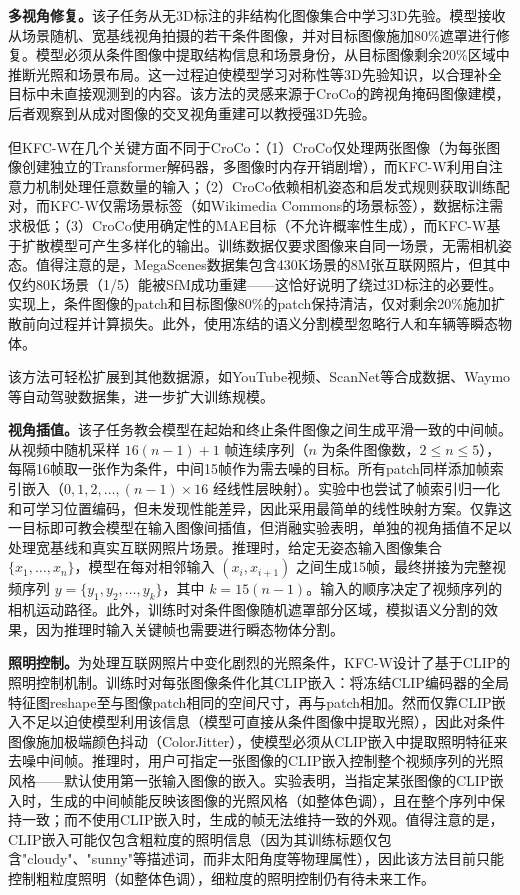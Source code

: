\textbf{多视角修复。}该子任务从无3D标注的非结构化图像集合中学习3D先验。模型接收从场景随机、宽基线视角拍摄的若干条件图像，并对目标图像施加80\%遮罩进行修复。模型必须从条件图像中提取结构信息和场景身份，从目标图像剩余20\%区域中推断光照和场景布局。这一过程迫使模型学习对称性等3D先验知识，以合理补全目标中未直接观测到的内容。该方法的灵感来源于CroCo的跨视角掩码图像建模，后者观察到从成对图像的交叉视角重建可以教授强3D先验。

但KFC-W在几个关键方面不同于CroCo：（1）CroCo仅处理两张图像（为每张图像创建独立的Transformer解码器，多图像时内存开销剧增），而KFC-W利用自注意力机制处理任意数量的输入；（2）CroCo依赖相机姿态和启发式规则获取训练配对，而KFC-W仅需场景标签（如Wikimedia Commons的场景标签），数据标注需求极低；（3）CroCo使用确定性的MAE目标（不允许概率性生成），而KFC-W基于扩散模型可产生多样化的输出。训练数据仅要求图像来自同一场景，无需相机姿态。值得注意的是，MegaScenes数据集包含430K场景的8M张互联网照片，但其中仅约80K场景（1/5）能被SfM成功重建——这恰好说明了绕过3D标注的必要性。实现上，条件图像的patch和目标图像80\%的patch保持清洁，仅对剩余20\%施加扩散前向过程并计算损失。此外，使用冻结的语义分割模型忽略行人和车辆等瞬态物体。

该方法可轻松扩展到其他数据源，如YouTube视频、ScanNet等合成数据、Waymo等自动驾驶数据集，进一步扩大训练规模。

\textbf{视角插值。}该子任务教会模型在起始和终止条件图像之间生成平滑一致的中间帧。从视频中随机采样 $16(n-1)+1$ 帧连续序列（$n$ 为条件图像数，$2 \le n \le 5$），每隔16帧取一张作为条件，中间15帧作为需去噪的目标。所有patch同样添加帧索引嵌入（$0, 1, 2, \ldots, (n{-}1)\times 16$ 经线性层映射）。实验中也尝试了帧索引归一化和可学习位置编码，但未发现性能差异，因此采用最简单的线性映射方案。仅靠这一目标即可教会模型在输入图像间插值，但消融实验表明，单独的视角插值不足以处理宽基线和真实互联网照片场景。推理时，给定无姿态输入图像集合 $\{x_1, \ldots, x_n\}$，模型在每对相邻输入 $(x_i, x_{i+1})$ 之间生成15帧，最终拼接为完整视频序列 $y = \{y_1, y_2, \ldots, y_k\}$，其中 $k = 15(n{-}1)$。输入的顺序决定了视频序列的相机运动路径。此外，训练时对条件图像随机遮罩部分区域，模拟语义分割的效果，因为推理时输入关键帧也需要进行瞬态物体分割。

\textbf{照明控制。}为处理互联网照片中变化剧烈的光照条件，KFC-W设计了基于CLIP的照明控制机制。训练时对每张图像条件化其CLIP嵌入：将冻结CLIP编码器的全局特征图reshape至与图像patch相同的空间尺寸，再与patch相加。然而仅靠CLIP嵌入不足以迫使模型利用该信息（模型可直接从条件图像中提取光照），因此对条件图像施加极端颜色抖动（ColorJitter），使模型必须从CLIP嵌入中提取照明特征来去噪中间帧。推理时，用户可指定一张图像的CLIP嵌入控制整个视频序列的光照风格——默认使用第一张输入图像的嵌入。实验表明，当指定某张图像的CLIP嵌入时，生成的中间帧能反映该图像的光照风格（如整体色调），且在整个序列中保持一致；而不使用CLIP嵌入时，生成的帧无法维持一致的外观。值得注意的是，CLIP嵌入可能仅包含粗粒度的照明信息（因为其训练标题仅包含"cloudy"、"sunny"等描述词，而非太阳角度等物理属性），因此该方法目前只能控制粗粒度照明（如整体色调），细粒度的照明控制仍有待未来工作。

